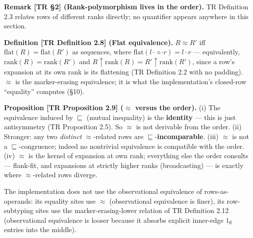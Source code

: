 \documentclass[
  10pt,
  letterpaper,
]{article}
\begin{document}
\textbf{Remark {[}TR §2{]} (Rank-polymorphism lives in the order).} TR
Definition 2.3 relates rows of different ranks directly; no quantifier
appears anywhere in this section.

\textbf{Definition {[}TR Definition 2.8{]} (Flat equivalence).}
\(R \approx R'\) iff \(\mathrm{flat}(R) = \mathrm{flat}(R')\) as
sequences, where \(\mathrm{flat}(l\cdot\diamond\cdot r) = l \cdot r\)
--- equivalently, \(\mathrm{rank}(R) = \mathrm{rank}(R')\) and
\(R{\uparrow}\mathrm{rank}(R) = R'{\uparrow}\mathrm{rank}(R')\), since a
row's expansion at its own rank is its flattening (TR Definition 2.2
with no padding). \(\approx\) is the marker-erasing equivalence; it is
what the implementation's closed-row ``equality'' computes (§10).

\textbf{Proposition {[}TR Proposition 2.9{]} (\(\approx\) versus the
order).} (i) The equivalence induced by \(\sqsubseteq\) (mutual
inequality) is the \textbf{identity} --- this is just antisymmetry (TR
Proposition 2.5). So \(\approx\) is not derivable from the order. (ii)
Stronger: any two \emph{distinct} \(\approx\)-related rows are
\(\sqsubseteq\)-\textbf{incomparable}. (iii) \(\approx\) is not a
\(\sqsubseteq\)-congruence; indeed no nontrivial equivalence is
compatible with the order. (iv) \(\approx\) is the kernel of expansion
at own rank; everything else the order consults --- flank-fit, and
expansions at strictly higher ranks (broadcasting) --- is exactly where
\(\approx\)-related rows diverge.

The implementation does not use the observational equivalence of
rows-as-operands: its equality sites use \(\approx\) (observational
equivalence is finer), its row-subtyping sites use the
marker-erasing-lower relation of TR Definition 2.12 (observational
equivalence is looser because it absorbs explicit inner-edge
\(1_\emptyset\) entries into the middle).
\end{document}

